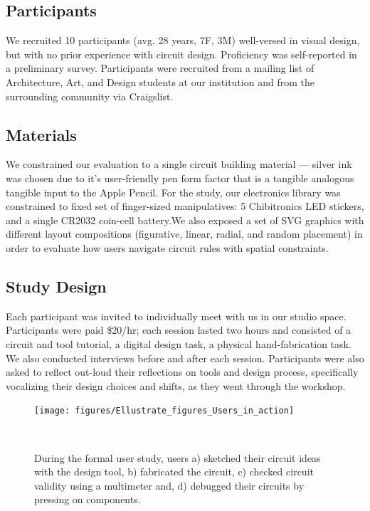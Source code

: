 \documentclass{sigchi}
\begin{document}
\subsection{Participants}
    We recruited 10 participants (avg. 28 years, 7F, 3M) well-versed in visual design, but with no prior experience with circuit design. Proficiency was self-reported in a preliminary survey. Participants were recruited from a mailing list of Architecture, Art, and Design students at our institution and from the surrounding community via Craigslist.

\subsection{Materials}
    We constrained our evaluation to a single circuit building material --- silver ink was chosen due to it's user-friendly pen form factor that is a tangible analogous tangible input to the Apple Pencil. For the study, our electronics library was constrained to fixed set of finger-sized manipulatives: 5 Chibitronics LED stickers, and a single CR2032 coin-cell battery.We also exposed a set of SVG graphics with different layout compositions (figurative, linear, radial, and random placement) in order to evaluate how users navigate circuit rules with spatial constraints. 

\subsection{Study Design}

    Each participant was invited to individually meet with us in our studio space. Participants were paid \$20/hr; each session lasted two hours and consisted of a circuit and tool tutorial, a digital design task, a physical hand-fabrication task. We also conducted interviews before and after each session. Participants were also asked to reflect out-loud their reflections on tools and design process, specifically vocalizing their design choices and shifts, as they went through the workshop. 
    
    \begin{figure}[t]
    \centering
      \texttt{[image: figures/Ellustrate\_figures\_Users\_in\_action]}
      \caption{During the formal user study, users a) sketched their circuit ideas with the design tool, b) fabricated the circuit, c) checked circuit validity using a multimeter and, d) debugged their circuits by pressing on components.}~\label{fig:users-in-action}
      \vspace{-20pt}
    \end{figure}
\end{document}
